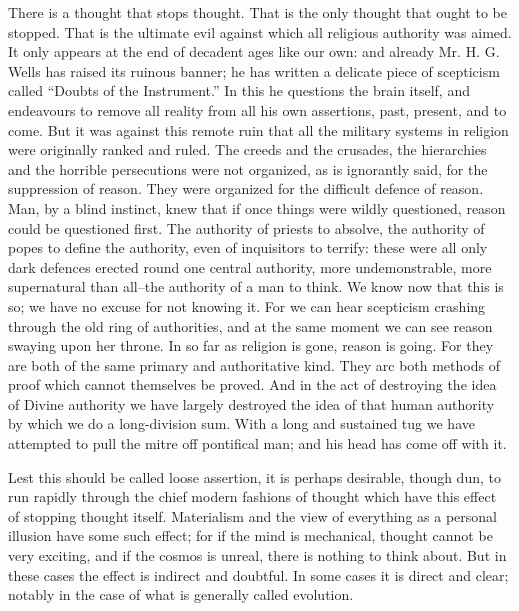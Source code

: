 \documentclass{book}
\begin{document}
There is a thought that stops thought. That is the only thought that ought to be stopped. That is the ultimate evil against which all religious authority was aimed. It only appears at the end of decadent ages like our own: and already Mr. H. G. Wells has raised its ruinous banner; he has written a delicate piece of scepticism called “Doubts of the Instrument.” In this he questions the brain itself, and endeavours to remove all reality from all his own assertions, past, present, and to come. But it was against this remote ruin that all the military systems in religion were originally ranked and ruled. The creeds and the crusades, the hierarchies and the horrible persecutions were not organized, as is ignorantly said, for the suppression of reason. They were organized for the difficult defence of reason. Man, by a blind instinct, knew that if once things were wildly questioned, reason could be questioned first. The authority of priests to absolve, the authority of popes to define the authority, even of inquisitors to terrify: these were all only dark defences erected round one central authority, more undemonstrable, more supernatural than all–the authority of a man to think. We know now that this is so; we have no excuse for not knowing it. For we can hear scepticism crashing through the old ring of authorities, and at the same moment we can see reason swaying upon her throne. In so far as religion is gone, reason is going. For they are both of the same primary and authoritative kind. They arc both methods of proof which cannot themselves be proved. And in the act of destroying the idea of Divine authority we have largely destroyed the idea of that human authority by which we do a long-division sum. With a long and sustained tug we have attempted to pull the mitre off pontifical man; and his head has come off with it.

Lest this should be called loose assertion, it is perhaps desirable, though dun, to run rapidly through the chief modern fashions of thought which have this effect of stopping thought itself. Materialism and the view of everything as a personal illusion have some such effect; for if the mind is mechanical, thought cannot be very exciting, and if the cosmos is unreal, there is nothing to think about. But in these cases the effect is indirect and doubtful. In some cases it is direct and clear; notably in the case of what is generally called evolution.
\end{document}
